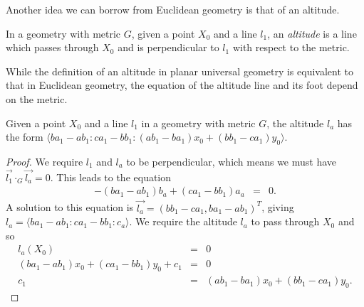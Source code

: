 Another idea we can borrow from Euclidean geometry is that of an altitude.
\begin{definition}In a geometry with metric $G$, given a point $X_0$ and a line $l_1$, an \emph{altitude} is a line which passes through $X_0$ and is perpendicular to $l_1$ with respect to the metric.
\end{definition}
While the definition of an altitude in planar universal geometry is equivalent to that in Euclidean geometry, the equation of the altitude line and its foot depend on the metric.
\begin{theorem}Given a point $X_0$ and a line $l_1$ in a geometry with metric $G$, the altitude $l_a$ has the form $\langle ba_1 - ab_1\!:\!ca_1 - bb_1\!:\!(ab_1 - ba_1)x_0 + (bb_1 - ca_1)y_0 \rangle$.
\end{theorem}
\begin{proof}
We require $l_1$ and $l_a$ to be perpendicular, which means we must have $\vec{l_1}\cdot_G\vec{l_a} = 0$.
This leads to the equation
\begin{eqnarray}
-(ba_1 - ab_1)b_a + (ca_1 - bb_1)a_a & = & 0.\nonumber
\end{eqnarray}
A solution to this equation is $\vec{l_a} = (bb_1 - ca_1, ba_1 - ab_1)^T$, giving $l_a = \langle ba_1 - ab_1\!:ca_1 - bb_1\! \!:\! c_a \rangle$.
We require the altitude $l_a$ to pass through $X_0$ and so
\begin{eqnarray*}
l_a(X_0) & = & 0\\
(ba_1 - ab_1)x_0 + (ca_1 - bb_1)y_0 + c_1 & = & 0\\
c_1 & = & (ab_1 - ba_1)x_0 + (bb_1 - ca_1)y_0.
\end{eqnarray*}
\end{proof}


